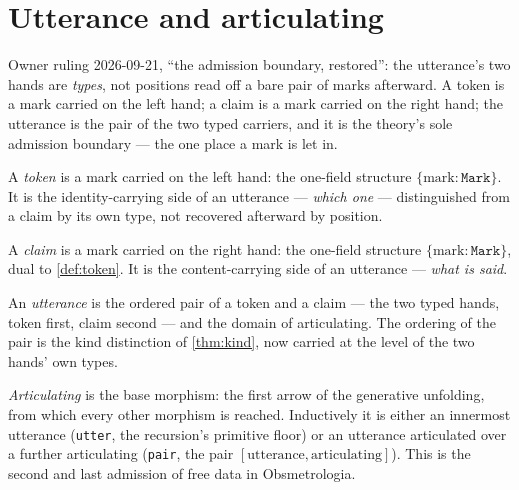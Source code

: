 \section{Utterance and articulating}

Owner ruling 2026-09-21, ``the admission boundary, restored'': the utterance's
two hands are \emph{types}, not positions read off a bare pair of marks
afterward. A token is a mark carried on the left hand; a claim is a mark
carried on the right hand; the utterance is the pair of the two typed
carriers, and it is the theory's sole admission boundary --- the one place a
mark is let in.

\begin{definition}[Token]
  \label{def:token}
  \leanok
  A \emph{token} is a mark carried on the left hand: the one-field structure
  $\{\text{mark} : \texttt{Mark}\}$. It is the identity-carrying side of an
  utterance --- \emph{which one} --- distinguished from a claim by its own
  type, not recovered afterward by position.
\end{definition}

\begin{definition}[Claim]
  \label{def:claim}
  \leanok
  A \emph{claim} is a mark carried on the right hand: the one-field structure
  $\{\text{mark} : \texttt{Mark}\}$, dual to \cref{def:token}. It is the
  content-carrying side of an utterance --- \emph{what is said}.
\end{definition}

\begin{definition}[Utterance]
  \label{def:utterance}
  \leanok
  An \emph{utterance} is the ordered pair of a token and a claim --- the two
  typed hands, token first, claim second --- and the domain of articulating.
  The ordering of the pair is the kind distinction of \cref{thm:kind}, now
  carried at the level of the two hands' own types.
\end{definition}

\begin{definition}[Articulating]
  \label{def:articulating}
  \leanok
  \emph{Articulating} is the base morphism: the first arrow of the generative
  unfolding, from which every other morphism is reached. Inductively it is
  either an innermost utterance (\texttt{utter}, the recursion's primitive
  floor) or an utterance articulated over a further articulating
  (\texttt{pair}, the pair $[\text{utterance}, \text{articulating}]$). This is
  the second and last admission of free data in Obsmetrologia.
\end{definition}

